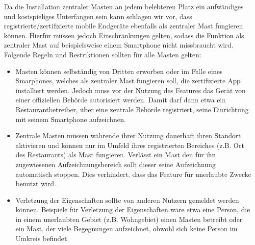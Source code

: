\documentclass[conference,compsoc]{IEEEtran}
\begin{document}
Da die Installation zentraler Masten an jedem belebteren Platz ein aufwändiges und kostspieliges Unterfangen sein kann schlagen wir vor, dass registrierte/zertifizierte mobile Endgeräte ebenfalls als zentraler Mast fungieren können. 
Hierfür müssen jedoch Einschränkungen gelten, sodass die Funktion als zentraler Mast auf beispielsweise einem Smartphone nicht missbraucht wird.
Folgende Regeln und Restriktionen sollten für alle Masten gelten:
\begin{itemize}
	\item Masten können selbständig von Dritten erworben oder im Falle eines Smarphones, welches als zentraler Mast fungieren soll, die zertifizierte App installiert werden. 
	Jedoch muss vor der Nutzung des Features das Gerät von einer offiziellen Behörde autorisiert werden. Damit darf dann etwa ein Restaurantbetreiber, über eine zentrale Behörde registriert, seine Einrichtung mit seinem Smartphone aufzeichnen. 
	\item Zentrale Masten müssen währende ihrer Nutzung dauerhaft ihren Standort aktivieren und können nur im Umfeld ihres registrierten Bereiches (z.B. Ort des Restaurants) als Mast fungieren. 
	Verlässt ein Mast den für ihn zugewiesenen Aufzeichnungsbereich sollt dieser seine Aufzeichnung automatisch stoppen. Dies verhindert, dass das Feature für unerlaubte Zwecke benutzt wird.
	\item Verletzung der Eigenschaften sollte von anderen Nutzern gemeldet werden können. 
	Beispiele für Verletzung der Eigenschaften wäre etwa eine Person, die in einem unerlaubten Gebiet (z.B. Wohngebiet) einen Masten betreibt oder ein Mast, der viele Begegnungen aufzeichnet, obwohl sich keine Person im Umkreis befindet.  
\end{itemize}
\end{document}
